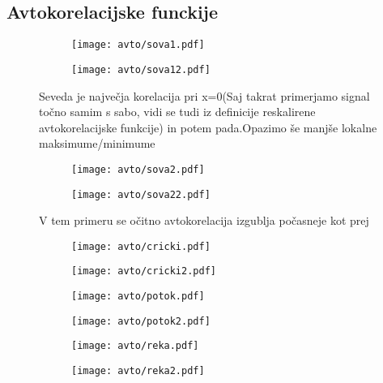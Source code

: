 \documentclass{article}
\begin{document}
\subsection{Avtokorelacijske funckije}
\newpage
\begin{figure}[H]
\begin{subfigure}{.5\textwidth}
\texttt{[image: avto/sova1.pdf]}
\end{subfigure}
\begin{subfigure}{.5\textwidth}
\texttt{[image: avto/sova12.pdf]}
\end{subfigure}
\caption*{Seveda je največja korelacija pri x=0(Saj takrat primerjamo signal točno samim s sabo, vidi se tudi iz definicije reskalirene avtokorelacijske funkcije) in potem pada.Opazimo še manjše lokalne maksimume/minimume} 
\end{figure}

\begin{figure}[H]
\begin{subfigure}{.5\textwidth}
\texttt{[image: avto/sova2.pdf]}
\end{subfigure}
\begin{subfigure}{.5\textwidth}
\texttt{[image: avto/sova22.pdf]}
\end{subfigure}
\caption*{V tem primeru se očitno avtokorelacija izgublja počasneje kot prej}
\end{figure}

\begin{figure}[H]
\begin{subfigure}{.5\textwidth}
\texttt{[image: avto/cricki.pdf]}
\end{subfigure}
\begin{subfigure}{.5\textwidth}
\texttt{[image: avto/cricki2.pdf]}
\end{subfigure}
\end{figure}

\begin{figure}[H]
\begin{subfigure}{.5\textwidth}
\texttt{[image: avto/potok.pdf]}
\end{subfigure}
\begin{subfigure}{.5\textwidth}
\texttt{[image: avto/potok2.pdf]}
\end{subfigure}
\end{figure}

\begin{figure}[H]
\begin{subfigure}{.5\textwidth}
\texttt{[image: avto/reka.pdf]}
\end{subfigure}
\begin{subfigure}{.5\textwidth}
\texttt{[image: avto/reka2.pdf]}
\end{subfigure}
\end{figure}
\end{document}
